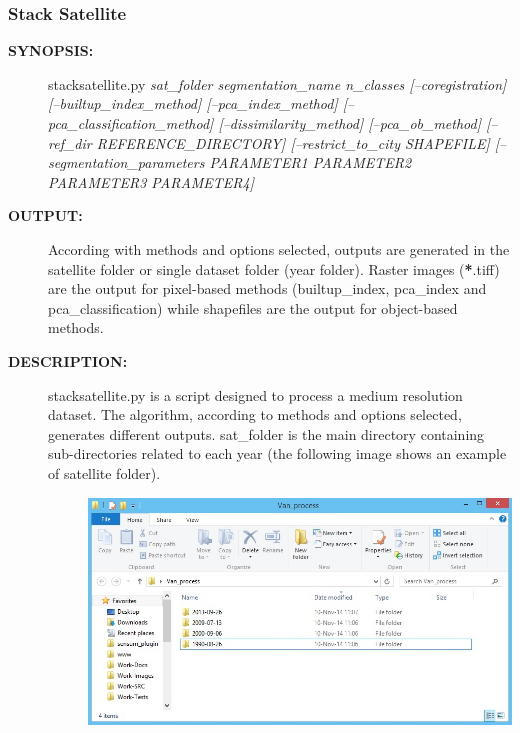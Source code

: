 \documentclass[letterpaper,10pt,english]{sphinxmanual}
\begin{document}
\subsubsection{Stack Satellite}
\label{user:stack-satellite}\begin{description}
\item[{\textbf{SYNOPSIS:}}] \leavevmode
stacksatellite.py \emph{sat\_folder segmentation\_name n\_classes {[}--coregistration{]} {[}--builtup\_index\_method{]} {[}--pca\_index\_method{]} {[}--pca\_classification\_method{]} {[}--dissimilarity\_method{]} {[}--pca\_ob\_method{]} {[}--ref\_dir REFERENCE\_DIRECTORY{]} {[}--restrict\_to\_city SHAPEFILE{]} {[}--segmentation\_parameters PARAMETER1 PARAMETER2 PARAMETER3 PARAMETER4{]}}

\item[{\textbf{OUTPUT:}}] \leavevmode
According with methods and options selected, outputs are generated in the satellite folder or single dataset folder (year folder). Raster images ({\color{red}\bfseries{}*}.tiff) are the output for pixel-based methods (builtup\_index, pca\_index and pca\_classification) while shapefiles are the output for object-based methods.

\item[{\textbf{DESCRIPTION:}}] \leavevmode\begin{description}
\item[{stacksatellite.py is a script designed to process a medium resolution dataset. The algorithm, according to methods and options selected, generates different outputs. sat\_folder is the main directory containing sub-directories related to each year (the following image shows an example of satellite folder).}] \leavevmode
\includegraphics{sat_folder.png}

\end{description}


\end{description}
\end{document}
